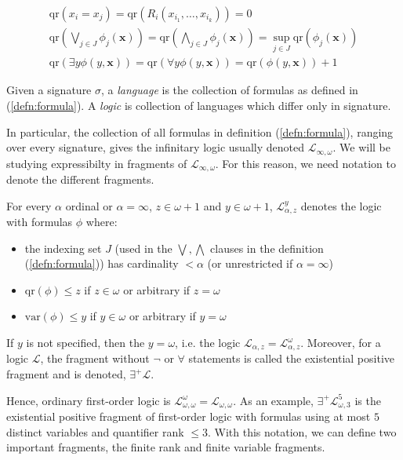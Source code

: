 \begin{eqnarray*}
\text{qr}(x_{i} = x_{j}) = \text{qr}(R_{i}(x_{i_{1}},\dots,x_{i_{k}})) = 0 \\
\text{qr}(\bigvee_{j \in J} \phi_{j}(\mathbf{x})) = \text{qr}(\bigwedge_{j \in J} \phi_{j}(\mathbf{x}))  = \sup_{j \in J} \text{qr}(\phi_{j}(\mathbf{x})) \\
\text{qr}(\exists y \phi(y,\mathbf{x})) = \text{qr}(\forall y \phi(y,\mathbf{x})) = \text{qr}(\phi(y,\mathbf{x})) + 1 
\end{eqnarray*}
\begin{defn}
Given a signature $\sigma$, a \textit{language} is the collection of formulas as defined in (\ref{defn:formula}). A \textit{logic} is collection of languages which differ only in signature. 
\end{defn}
In particular, the collection of all formulas in definition (\ref{defn:formula}), ranging over every signature, gives the infinitary logic usually denoted $\mathcal{L}_{\infty,\omega}$. We will be studying expressibilty in fragments of $\mathcal{L}_{\infty,\omega}$. For this reason, we need notation to denote the different fragments.
\begin{defn}
For every $\alpha$ ordinal or $\alpha = \infty$, $z \in \omega+1$ and $y \in \omega+1$, $\mathcal{L}^{y}_{\alpha,z}$ denotes the logic with formulas $\phi$ where:
\begin{itemize}
    \item the indexing set $J$ (used in the $\bigvee, \bigwedge$ clauses in the definition (\ref{defn:formula})) has cardinality $< \alpha$ (or unrestricted if $\alpha = \infty$)
    \item $\text{qr}(\phi) \leq z$ if $z \in \omega$ or arbitrary if $z = \omega$
    \item $\text{var}(\phi) \leq y$ if $y \in \omega$ or arbitrary if $y = \omega$
\end{itemize}
If $y$ is not specified, then the $y = \omega$, i.e. the logic $\mathcal{L}_{\alpha,z} = \mathcal{L}^{\omega}_{\alpha,z}$. Moreover, for a logic $\mathcal{L}$, the fragment without $\neg$ or $\forall$ statements is called the existential positive fragment and is denoted, $\exists^{+}\mathcal{L}$.
\end{defn}
Hence, ordinary first-order logic is $\mathcal{L}^{\omega}_{\omega,\omega} = \mathcal{L}_{\omega,\omega}$. As an example, $\exists^{+}\mathcal{L}^{5}_{\omega,3}$ is the existential positive fragment of first-order logic with formulas using at most $5$ distinct variables and quantifier rank $\leq 3$. With this notation, we can define two important fragments, the finite rank and finite variable fragments. 

